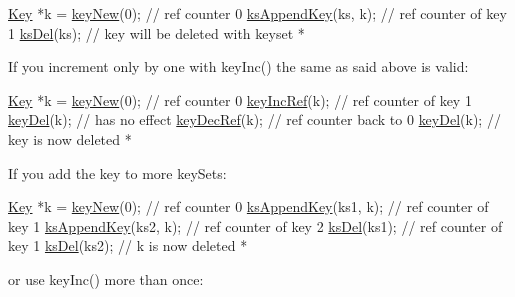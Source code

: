 \begin{DoxyCode}
\hyperlink{classkdb_1_1Key_a5679f5cae63caddd64a60388b9cc77fa}{Key} *k = \hyperlink{group__key_gaf6893c038b3ebee90c73a9ea8356bebf}{keyNew}(0); \textcolor{comment}{// ref counter 0}
\hyperlink{group__keyset_gaa5a1d467a4d71041edce68ea7748ce45}{ksAppendKey}(ks, k); \textcolor{comment}{// ref counter of key 1}
\hyperlink{group__keyset_ga27e5c16473b02a422238c8d970db7ac8}{ksDel}(ks); \textcolor{comment}{// key will be deleted with keyset}
 *
\end{DoxyCode}


If you increment only by one with key\-Inc() the same as said above is valid\-:


\begin{DoxyCode}
\hyperlink{classkdb_1_1Key_a5679f5cae63caddd64a60388b9cc77fa}{Key} *k = \hyperlink{group__key_gaf6893c038b3ebee90c73a9ea8356bebf}{keyNew}(0); \textcolor{comment}{// ref counter 0}
\hyperlink{group__key_ga6970a6f254d67af7e39f8e469bb162f1}{keyIncRef}(k); \textcolor{comment}{// ref counter of key 1}
\hyperlink{group__key_ga3df95bbc2494e3e6703ece5639be5bb1}{keyDel}(k);    \textcolor{comment}{// has no effect}
\hyperlink{group__key_ga2c6433ca22109e4e141946057eccb283}{keyDecRef}(k); \textcolor{comment}{// ref counter back to 0}
\hyperlink{group__key_ga3df95bbc2494e3e6703ece5639be5bb1}{keyDel}(k);    \textcolor{comment}{// key is now deleted}
 *
\end{DoxyCode}


If you add the key to more key\-Sets\-:


\begin{DoxyCode}
\hyperlink{classkdb_1_1Key_a5679f5cae63caddd64a60388b9cc77fa}{Key} *k = \hyperlink{group__key_gaf6893c038b3ebee90c73a9ea8356bebf}{keyNew}(0); \textcolor{comment}{// ref counter 0}
\hyperlink{group__keyset_gaa5a1d467a4d71041edce68ea7748ce45}{ksAppendKey}(ks1, k); \textcolor{comment}{// ref counter of key 1}
\hyperlink{group__keyset_gaa5a1d467a4d71041edce68ea7748ce45}{ksAppendKey}(ks2, k); \textcolor{comment}{// ref counter of key 2}
\hyperlink{group__keyset_ga27e5c16473b02a422238c8d970db7ac8}{ksDel}(ks1); \textcolor{comment}{// ref counter of key 1}
\hyperlink{group__keyset_ga27e5c16473b02a422238c8d970db7ac8}{ksDel}(ks2); \textcolor{comment}{// k is now deleted}
 *
\end{DoxyCode}


or use key\-Inc() more than once\-:


